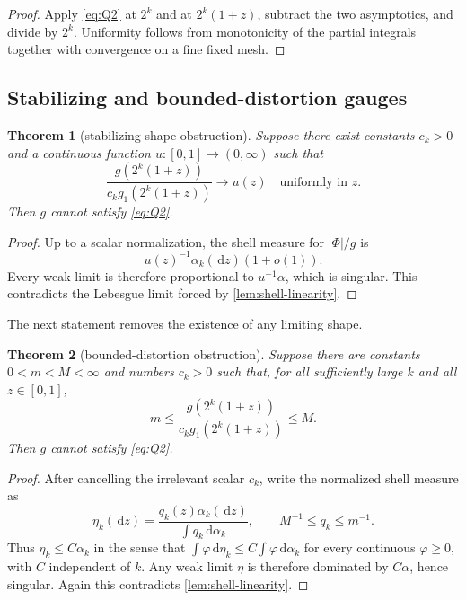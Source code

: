 \documentclass[11pt,oneside]{article}
\newtheorem{theorem}{Theorem}[section]
\theoremstyle{definition}
\theoremstyle{remark}
\newcommand{\dd}{\,\mathrm d}
\begin{document}
\begin{proof}
Apply \eqref{eq:Q2} at \(2^k\) and at \(2^k(1+z)\), subtract the two
asymptotics, and divide by \(2^k\).  Uniformity follows from monotonicity of
the partial integrals together with convergence on a fine fixed mesh.
\end{proof}

\subsection{Stabilizing and bounded-distortion gauges}

\begin{theorem}[stabilizing-shape obstruction]
\label{thm:stabilizing-obstruction}
Suppose there exist constants \(c_k>0\) and a continuous function
\(u:[0,1]\to(0,\infty)\) such that
\begin{equation}
 \frac{g(2^k(1+z))}{c_kg_1(2^k(1+z))}\longrightarrow u(z)
 \quad\text{uniformly in }z.
 \label{eq:stabilizing}
\end{equation}
Then \(g\) cannot satisfy \eqref{eq:Q2}.
\end{theorem}

\begin{proof}
Up to a scalar normalization, the shell measure for \(|\Phi|/g\) is
\[
 u(z)^{-1}\alpha_k(\dd z)(1+o(1)).
\]
Every weak limit is therefore proportional to
\(u^{-1}\alpha\), which is singular.  This contradicts the Lebesgue limit
forced by \cref{lem:shell-linearity}.
\end{proof}

The next statement removes the existence of any limiting shape.

\begin{theorem}[bounded-distortion obstruction]
\label{thm:bounded-distortion}
Suppose there are constants \(0<m<M<\infty\) and numbers \(c_k>0\) such
that, for all sufficiently large \(k\) and all \(z\in[0,1]\),
\begin{equation}
 m\le
 \frac{g(2^k(1+z))}{c_kg_1(2^k(1+z))}
 \le M.
 \label{eq:bounded-distortion}
\end{equation}
Then \(g\) cannot satisfy \eqref{eq:Q2}.
\end{theorem}

\begin{proof}
After cancelling the irrelevant scalar \(c_k\), write the normalized shell
measure as
\[
 \eta_k(\dd z)=\frac{q_k(z)\alpha_k(\dd z)}{\int q_k\dd\alpha_k},
 \qquad M^{-1}\le q_k\le m^{-1}.
\]
Thus \(\eta_k\le C\alpha_k\) in the sense that
\(\int\varphi\dd\eta_k\le C\int\varphi\dd\alpha_k\) for every
continuous \(\varphi\ge0\), with \(C\) independent of \(k\).  Any weak
limit \(\eta\) is therefore dominated by \(C\alpha\), hence singular.
Again this contradicts \cref{lem:shell-linearity}.
\end{proof}
\end{document}

